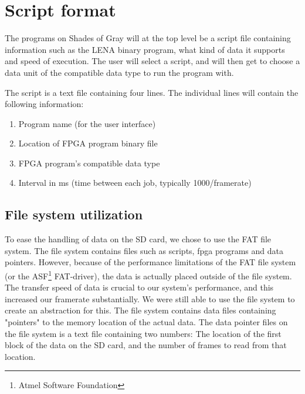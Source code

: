 \section{Script format}

The programs on { Shades of Gray} will at the top level be a script file containing information such as the LENA binary program, what kind of data it supports and speed of execution. The user will select a script, and will then get to choose a data unit of the compatible data type to run the program with.

The script is a text file containing four lines. The individual lines will contain the following information:

\begin{enumerate}
\item Program name (for the user interface)
\item Location of FPGA program binary file
\item FPGA program's compatible data type
\item Interval in ms (time between each job, typically 1000/framerate)
\end{enumerate}

\subsection{File system utilization}
To ease the handling of data on the SD card, we chose to use the FAT file system. The file system contains files such as scripts, fpga programs and data pointers. However, because of the performance limitations of the FAT file system (or the ASF\footnote{Atmel Software Foundation} FAT-driver), the data is actually placed outside of the file system. The transfer speed of data is crucial to our system's performance, and this increased our framerate substantially. We were still able to use the file system to create an abstraction for this. The file system contains data files containing "pointers" to the memory location of the actual data. The data pointer files on the file system is a text file containing two numbers: The location of the first block of the data on the SD card, and the number of frames to read from that location.


